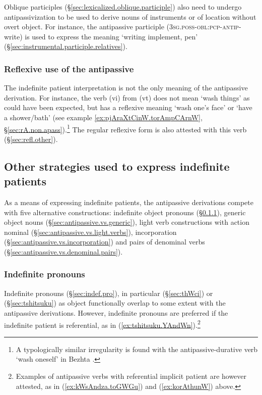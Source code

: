 Oblique participles (§\ref {sec:lexicalized.oblique.participle}) also need to undergo antipassivization to be used to derive nouns of instruments or of location without overt object. For instance, the antipassive participle  (\textsc{3sg}.\textsc{poss}-\textsc{obl}:\textsc{pcp}-\textsc{antip}-write) is used to express the meaning `writing implement, pen' (§\ref {sec:instrumental.participle.relatives}).
 

   \subsubsection{Reflexive use of the antipassive  } \label{sec:antipassive.reflexive}
      
The indefinite patient interpretation is not the only meaning of the  antipassive derivation. For instance, the verb  (vi) from  (vt) does not mean `wash things' as could have been expected, but has a reflexive meaning `wash one's face' or `have a shower/bath' (see example \ref{ex:pjAraXtCinW.torAmpCArnW}, §\ref{sec:rA.non.apass}).\footnote{A typologically similar irregularity is found with the antipassive-durative verb  `wash oneself' in Bezhta 
\citep[554]{khalilova16bezhta.valency}. } The regular reflexive form  is also attested with this verb (§\ref{sec:refl.other}).

  \subsection{Other strategies used to express indefinite patients } \label{sec:non.antipassive.indef.patient}
As a means of expressing indefinite patients, the antipassive derivations compete with five alternative constructions: indefinite  object pronouns (§\ref{sec:antipassive.vs.indef.pronouns}), generic object nouns (§\ref{sec:antipassive.vs.generic}), light verb constructions with action nominal (§\ref{sec:antipassive.vs.light.verbs}), incorporation (§\ref{sec:antipassive.vs.incorporation}) and pairs of denominal verbs (§\ref{sec:antipassive.vs.denominal.pairs}).  

\subsubsection{Indefinite pronouns } \label{sec:antipassive.vs.indef.pronouns}
Indefinite pronouns (§\ref{sec:indef.pro}), in particular  (§\ref{sec:thWci}) or   (§\ref{sec:tshitsuku}) as object functionally overlap to some extent with the  antipassive derivations. However, indefinite pronouns are preferred if the indefinite patient is referential, as in (\ref{ex:tshitsuku.YAndWn}).\footnote{Examples of antipassive verbs with referential implicit patient are however attested, as in (\ref{ex:kWsAndza.toGWGu}) and (\ref{ex:korAthunW}) above. }

